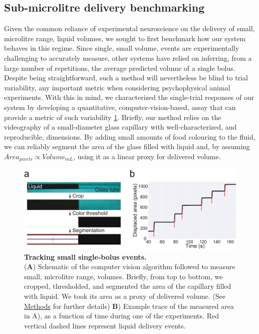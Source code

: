 \subsection*{Sub-microlitre delivery benchmarking}

Given the common reliance of experimental neuroscience on the delivery of small, microlitre range, liquid volumes, we sought to first benchmark how our system behaves in this regime. Since single, small volume, events are experimentally challenging to accurately measure, other systems have relied on inferring, from a large number of repetitions, the average predicted volume of a single bolus. Despite being straightforward, such a method will nevertheless be blind to trial variability, any important metric when considering psychophysical animal experiments. With this in mind, we characterized the single-trial responses of our system by developing a quantitative, computer-vision-based, assay that can provide a metric of such variability \ref{fig:PumpProtocol}. Briefly, our method relies on the videography of a small-diameter glass capillary with well-characterized, and reproducible, dimensions. By adding small amounts of food colouring to the fluid, we can reliably segment the area of the glass filled with liquid and, by assuming $Area_{pixels} \propto Volume_{mL}$, using it as a linear proxy for delivered volume. 

\begin{figure} 
	\centering
	\includegraphics[width=1.0\linewidth]{Figures/Artboard 1_1.pdf}
	\caption{\textbf{Tracking small single-bolus events.}\\
		(\textbf{A}) Schematic of the computer vision algorithm followed to measure small, microlitre range, volumes. Briefly, from top to bottom, we cropped, thresholded, and segmented the area of the capillary filled with liquid. We took its area as a proxy of delivered volume. (See \hyperref[s:methods]{Methods} for further details)  \textbf{B}) Example trace of the measured area in A), as a function of time during one of the experiments. Red vertical dashed lines represent liquid delivery events.}
	\label{fig:PumpProtocol} 
\end{figure}

